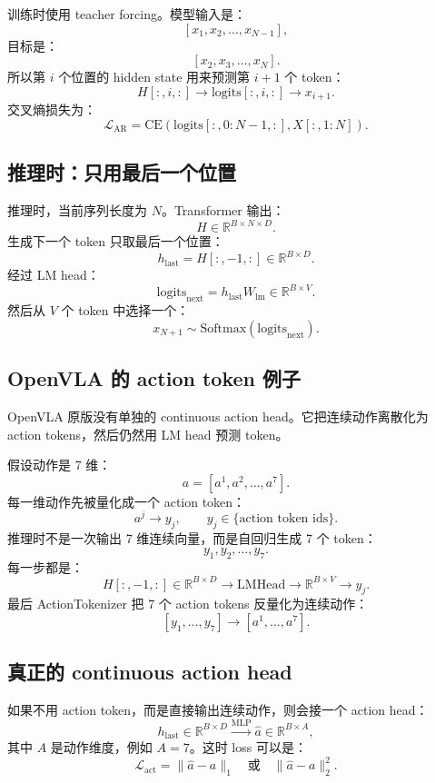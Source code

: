 \documentclass[11pt,a4paper]{ctexart}
\begin{document}
训练时使用 teacher forcing。模型输入是：
\[
  [x_1,x_2,\ldots,x_{N-1}],
\]
目标是：
\[
  [x_2,x_3,\ldots,x_N].
\]
所以第 \(i\) 个位置的 hidden state 用来预测第 \(i+1\) 个 token：
\[
  H[:,i,:]\rightarrow \mathrm{logits}[:,i,:]\rightarrow x_{i+1}.
\]
交叉熵损失为：
\[
  \mathcal{L}_{\mathrm{AR}}
  =
  \mathrm{CE}\left(
    \mathrm{logits}[:,0:N-1,:],
    X[:,1:N]
  \right).
\]

\subsection{推理时：只用最后一个位置}

推理时，当前序列长度为 \(N\)。Transformer 输出：
\[
  H\in\mathbb{R}^{B\times N\times D}.
\]
生成下一个 token 只取最后一个位置：
\[
  h_{\mathrm{last}}=H[:,-1,:]\in\mathbb{R}^{B\times D}.
\]
经过 LM head：
\[
  \mathrm{logits}_{\mathrm{next}}
  =
  h_{\mathrm{last}}W_{\mathrm{lm}}
  \in\mathbb{R}^{B\times V}.
\]
然后从 \(V\) 个 token 中选择一个：
\[
  x_{N+1}\sim\mathrm{Softmax}(\mathrm{logits}_{\mathrm{next}}).
\]

\subsection{OpenVLA 的 action token 例子}

OpenVLA 原版没有单独的 continuous action head。它把连续动作离散化为 action tokens，然后仍然用 LM head 预测 token。

假设动作是 7 维：
\[
  a=[a^1,a^2,\ldots,a^7].
\]
每一维动作先被量化成一个 action token：
\[
  a^j \rightarrow y_j,\qquad y_j\in\{\text{action token ids}\}.
\]
推理时不是一次输出 7 维连续向量，而是自回归生成 7 个 token：
\[
  y_1,y_2,\ldots,y_7.
\]
每一步都是：
\[
  H[:,-1,:]\in\mathbb{R}^{B\times D}
  \rightarrow
  \mathrm{LMHead}
  \rightarrow
  \mathbb{R}^{B\times V}
  \rightarrow
  y_j.
\]
最后 ActionTokenizer 把 7 个 action tokens 反量化为连续动作：
\[
  [y_1,\ldots,y_7]\rightarrow [a^1,\ldots,a^7].
\]

\subsection{真正的 continuous action head}

如果不用 action token，而是直接输出连续动作，则会接一个 action head：
\[
  h_{\mathrm{last}}\in\mathbb{R}^{B\times D}
  \xrightarrow{\mathrm{MLP}}
  \hat{a}\in\mathbb{R}^{B\times A},
\]
其中 \(A\) 是动作维度，例如 \(A=7\)。这时 loss 可以是：
\[
  \mathcal{L}_{\mathrm{act}}
  =
  \|\hat{a}-a\|_1
  \quad\text{或}\quad
  \|\hat{a}-a\|_2^2.
\]
\end{document}
